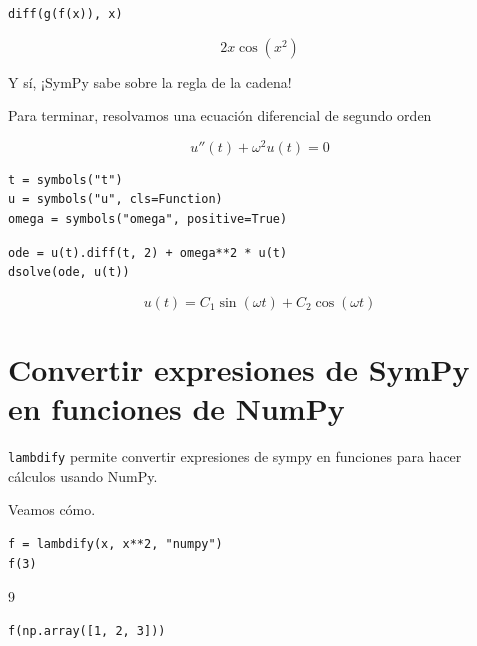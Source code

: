 \begin{listing}[H]
\begin{verbatim}
diff(g(f(x)), x)
\end{verbatim}
\end{listing}

\[2 x \cos{\left (x^{2} \right )}\]

Y sí, ¡SymPy sabe sobre la regla de la cadena!

Para terminar, resolvamos una ecuación diferencial de segundo orden

\[u''(t) + \omega^2 u(t) = 0\]

\begin{listing}[H]
\begin{verbatim}
t = symbols("t")
u = symbols("u", cls=Function)
omega = symbols("omega", positive=True)
\end{verbatim}
\end{listing}

\begin{listing}[H]
\begin{verbatim}
ode = u(t).diff(t, 2) + omega**2 * u(t)
dsolve(ode, u(t))
\end{verbatim}
\end{listing}

\[u{\left (t \right )} = C_{1} \sin{\left (\omega t \right )} + C_{2} \cos{\left (\omega t \right )}\]

\hypertarget{convertir-expresiones-de-sympy-en-funciones-de-numpy}{%
\section{Convertir expresiones de SymPy en funciones de
NumPy}\label{convertir-expresiones-de-sympy-en-funciones-de-numpy}}

\texttt{lambdify} permite convertir expresiones de sympy en funciones
para hacer cálculos usando NumPy.

Veamos cómo.

\begin{listing}[H]
\begin{verbatim}
f = lambdify(x, x**2, "numpy")
f(3)
\end{verbatim}
\end{listing}

9

\begin{listing}[H]
\begin{verbatim}
f(np.array([1, 2, 3]))
\end{verbatim}
\end{listing}

